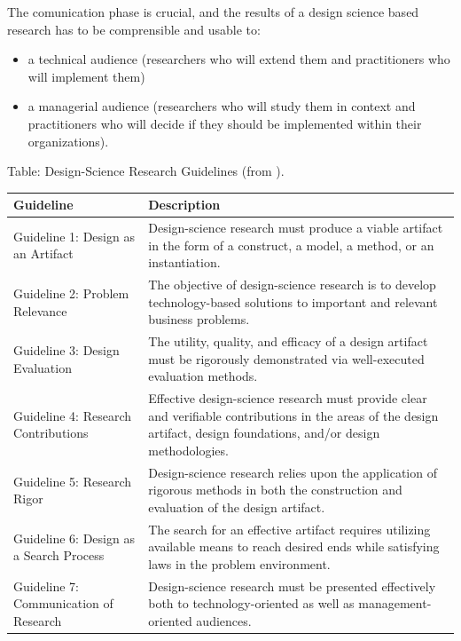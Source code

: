 \documentclass[]{book}
\providecommand{\tightlist}{%
  \setlength{\itemsep}{0pt}\setlength{\parskip}{0pt}}
\begin{document}
The comunication phase is crucial, and the results of a design science
based research has to be comprensible and usable to:

\begin{itemize}
\tightlist
\item
  a technical audience (researchers who will extend them and
  practitioners who will implement them)
\item
  a managerial audience (researchers who will study them in context and
  practitioners who will decide if they should be implemented within
  their organizations).
\end{itemize}

Table: \label{tab:introdesignscience} Design-Science Research Guidelines
(from \citep{bichler2006design}).

\begin{tabular}{l|l}
\hline
Guideline & Description\\
\hline
Guideline 1: Design as an Artifact & Design-science research must produce a viable artifact in the form of a construct, a model, a method, or an instantiation.\\
\hline
Guideline 2: Problem Relevance & The objective of design-science research is to develop technology-based solutions to important and relevant business problems.\\
\hline
Guideline 3: Design Evaluation & The utility, quality, and efficacy of a design artifact must be rigorously demonstrated via well-executed evaluation methods.\\
\hline
Guideline 4: Research Contributions & Effective design-science research must provide clear and verifiable contributions in the areas of the design artifact, design foundations, and/or design methodologies.\\
\hline
Guideline 5: Research Rigor & Design-science research relies upon the application of rigorous methods in both the construction and evaluation of the design artifact.\\
\hline
Guideline 6: Design as a Search Process & The search for an effective artifact requires utilizing available means to reach desired ends while satisfying laws in the problem environment.\\
\hline
Guideline 7: Communication of Research & Design-science research must be presented effectively both to technology-oriented as well as management-oriented audiences.\\
\hline
\end{tabular}
\end{document}
